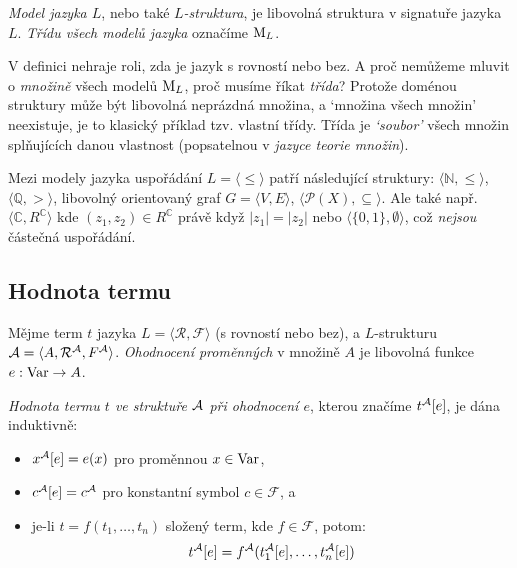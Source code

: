\begin{definition}
\emph{Model jazyka $L$}, nebo také \emph{$L$-struktura}, je libovolná struktura v signatuře jazyka $L$. \emph{Třídu všech modelů jazyka} označíme $\operatorname{M}_L$.
\end{definition}

\begin{remark}
V definici nehraje roli, zda je jazyk s rovností nebo bez. A proč nemůžeme mluvit o \emph{množině} všech modelů $\operatorname{M}_L$, proč musíme říkat \emph{třída}? Protože doménou struktury může být libovolná neprázdná množina, a `množina všech množin' neexistuje, je to klasický příklad tzv. vlastní třídy. Třída je \emph{`soubor'} všech množin splňujících danou vlastnost (popsatelnou v \emph{jazyce teorie množin}).
\end{remark}


\begin{example}
    Mezi modely jazyka uspořádání $L=\langle \leq \rangle$ patří následující struktury: $\langle \mathbb N,\leq\rangle$, $\langle \mathbb Q, > \rangle$, libovolný orientovaný graf $G=\langle V,E\rangle$, $\langle \mathcal P(X),\subseteq\rangle$. Ale také např. $\langle \mathbb C,R^\mathbb C\rangle$ kde $(z_1,z_2)\in R^\mathbb C$ právě když $|z_1|=|z_2|$ nebo $\langle \{0,1\},\emptyset\rangle$, což \emph{nejsou} částečná uspořádání.
\end{example}


\subsection{Hodnota termu}

Mějme term $t$ jazyka $L=\langle \mathcal R,\mathcal F\rangle$ (s rovností nebo bez), a $L$-strukturu $\mathcal{A}=\langle A,\mathcal R^{\mathcal{A}},F^{\mathcal{A}}\rangle$. \emph{Ohodnocení proměnných} v množině $A$ je libovolná funkce $e:\operatorname{Var}\to A$.

\begin{definition}
    \emph{Hodnota termu $t$ ve struktuře $\mathcal{A}$ při ohodnocení $e$}, kterou značíme $t^{\mathcal{A}}[e]$, je dána induktivně:
    \begin{itemize}
        \item $x^{\mathcal{A}}[e]=e(x)$ pro proměnnou $x\in\operatorname{Var}$,
        \item $c^{\mathcal{A}}[e]=c^{\mathcal{A}}$ pro konstantní symbol $c\in\mathcal F$, a
        \item je-li $t=f(t_1,\dots,t_n)$ složený term, kde $f\in\mathcal F$, potom:
        $$
        t^{\mathcal{A}}[e]=f^{\mathcal{A}}(t_1^{\mathcal{A}}[e],\dots,t_n^{\mathcal{A}}[e])
        $$
    \end{itemize}
\end{definition}


